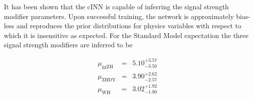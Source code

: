 
It has been shown that the cINN is capable of inferring the signal strength modifier parameters. Upon successful training, the network is approximately bias-less and reproduces the prior distributions for physics variables with respect to which it is insensitive as expected. For the Standard Model expectation the three signal strength modifiers are inferred to be

\begin{equation*}
	\boxed{
		\begin{array}{ccc}
			\mu_\text{ggZH} & = & 5.10^{+3.57}_{-3.50} \\[0.3em]
			\mu_\text{ZHDY} & = & 3.90^{+2.62}_{-2.57} \\[0.3em]
			\mu_\text{WH}   & = & 3.02^{+1.92}_{-1.90} \\
		\end{array}
	}
\end{equation*}